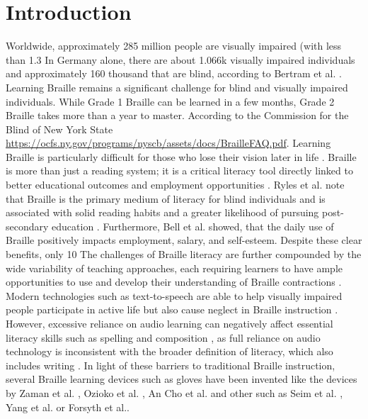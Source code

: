 \chapter{Introduction}
\label{ch:Introduction}

Worldwide, approximately 285 million people are visually impaired (with less than 1.3%
In Germany alone, there are about 1.066k visually impaired individuals and approximately 160 thousand that are blind, according to Bertram et al. \cite{Bertram2005}.
Learning Braille remains a significant challenge for blind and visually impaired individuals. While Grade 1 Braille can be learned in a few months, Grade 2 Braille takes more than a year to master. According to the Commission for the Blind of New York State \url{https://ocfs.ny.gov/programs/nyscb/assets/docs/BrailleFAQ.pdf}. Learning Braille is particularly difficult for those who lose their vision later in life \cite{Seim2014a}.
Braille is more than just a reading system; it is a critical literacy tool directly linked to better educational outcomes and employment opportunities \cite{Seim2014a, Ryles1996}. Ryles et al. note that Braille is the primary medium of literacy for blind individuals and is associated with solid reading habits and a greater likelihood of pursuing post-secondary education \cite{Ryles1996}. Furthermore, Bell et al. \cite{Bell2013} showed, that the daily use of Braille positively impacts employment, salary, and self-esteem.
Despite these clear benefits, only 10%
The challenges of Braille literacy are further compounded by the wide variability of teaching approaches, each requiring learners to have ample opportunities to use and develop their understanding of Braille contractions \cite{Swenson1999}. Modern technologies such as text-to-speech are able to help visually impaired people participate in active life but also cause neglect in Braille instruction \cite{Seim2014a}. However, excessive reliance on audio learning can negatively affect essential literacy skills such as spelling and composition \cite{Foulke1979}, as full reliance on audio technology is inconsistent with the broader definition of literacy, which also includes writing \cite{tuttle1996point}.
In light of these barriers to traditional Braille instruction, several Braille learning devices such as gloves have been invented like the devices by Zaman et al. \cite{Zaman2019}, Ozioko et al. \cite{Ozioko2017}, An \cite{An2004} Cho et al. \cite{Cho2002} and other such as Seim et al. \cite{Seim2014a, Seim2014, Seim2015}, Yang et al. \cite{Yang2017} or Forsyth et al.\cite{Learning2024}.
